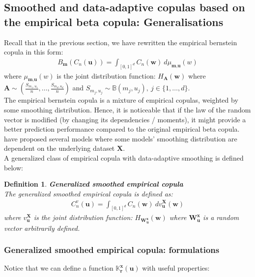 \documentclass[12pt]{report}
\newtheorem{definition}{Definition}[subsection]
\newcommand{\1}{\mathbf{1}}
\begin{document}
\begin{flushleft}
\newpage
\subsection{Smoothed and data-adaptive copulas based on the empirical beta copula: Generalisations}
\vspace{0.5cm}

Recall that in the previous section, we have rewritten the empirical bernstein copula in this form:
\begin{align*}
B_{\textbf{m}}(C_{n}(\textbf{u})) = \int_{[0,1]^d} C_{n}(\textbf{w})  \: d\mu_{\textbf{m},\textbf{u}}(w)  
\end{align*}
where $\mu_{\textbf{m},\textbf{u}}(w)$ is the joint distribution function: $H_{\textbf{A}}(\textbf{w})$ where $\textbf{A} \sim \left(\frac{S_{m_{1},u_{1}}}{n}, \dots, \frac{S_{m_{d},u_{d}}}{n}\right)$ and $S_{m_{j},u_{j}} \sim \mathbb{B}(m_{j},u_{j}), \: j \in \{1, \dots, d \}$. \\
\vspace{0.5cm}
The empirical bernstein copula is a mixture of empirical copulas, weighted by some smoothing distribution. Hence, it is noticeable that if the law of the random vector is modified (by changing its dependencies / moments), it might provide a better prediction performance compared to the original empirical beta copula. \cite{KojadinovicYi2024Smooth} have proposed several models where some models' smoothing distribution are dependent on the underlying dataset $\textbf{X}$. \\
\vspace{0.5cm}
A generalized class of empirical copula with data-adaptive smoothing is defined below:

\begin{definition}\label{SmoothECDefinition}
\textit{\normalfont\parencite{KojadinovicYi2024Smooth}}\:
\textbf{Generalized smoothed empirical copula} \\
The generalized smoothed empirical copula is defined as:
\begin{align*}
C_{n}^{v}(\textbf{u}) = \int_{[0,1]^d} C_{n}(\textbf{w}) \: dv^{\textbf{X}}_{\textbf{u}}(\textbf{w})
\end{align*}
where $v^{\textbf{X}}_{\textbf{u}}$ is the joint distribution function: $H_{\textbf{W}^{\textbf{x}}_{\textbf{u}}}(\textbf{w})$ where $\textbf{W}^{\textbf{x}}_{\textbf{u}}$ is a random vector arbitrarily defined.
\end{definition}

\newpage
\subsubsection{Generalized smoothed empirical copula: formulations}
\vspace{0.5cm}
Notice that we can define a function $\mathds{K}_{\textbf{r}}^{\textbf{x}}(\textbf{u})$ with useful properties:


\end{flushleft}
\end{document}
